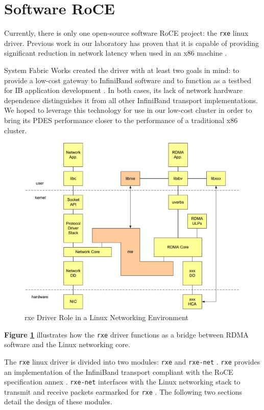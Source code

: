 \documentclass[11pt]{book}
\begin{document}
\section{\textbf{Software RoCE}}

Currently, there is only one open-source software RoCE project: the \verb;rxe;
linux driver. Previous work in our laboratory has proven that it is capable of
providing significant reduction in network latency when used in an x86 machine
\cite{lancaster-10}.

System Fabric Works created the driver with at least two goals in mind: to
provide a low-cost gateway to InfiniBand software and to function as a testbed
for IB application development \cite{pearson-10}. In both cases, its lack of
network hardware dependence distinguishes it from all other InfiniBand transport
implementations. We hoped to leverage this technology for use in our low-cost
cluster in order to bring its PDES performance closer to the performance of a
traditional x86 cluster.

\begin{figure}[h]
\includegraphics[width=\textwidth]{rxe_linux}
\caption{rxe Driver Role in a Linux Networking Environment \cite{pearson-10}}
\label{rxe-linux}
\end{figure}

\textbf{Figure \ref{rxe-linux}} illustrates how the \verb;rxe; driver functions
as a bridge between RDMA software and the Linux networking core.

The \verb;rxe; linux driver is divided into two modules: \verb;rxe; and
\verb;rxe-net; \cite{pearson-10}. \verb;rxe; provides an implementation of the
InfiniBand transport compliant with the RoCE specification annex
\cite{InfiniBandTARoCE-10}. \verb;rxe-net; interfaces with the Linux networking
stack to transmit and receive packets earmarked for \verb;rxe;
\cite{pearson-10}. The following two sections detail the design of these
modules.
\end{document}
